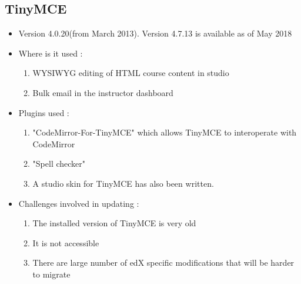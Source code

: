 \subsection{TinyMCE}
\begin{itemize}
	\item Version 4.0.20(from March 2013). Version 4.7.13 is available as of May 2018
	\item Where is it used :
		\begin{enumerate}
			\item WYSIWYG editing of HTML course content in studio
			\item Bulk email in the instructor dashboard
		\end{enumerate}
	\item Plugins used :
		\begin{enumerate}
			\item "CodeMirror-For-TinyMCE" which allows TinyMCE to interoperate with CodeMirror
			\item "Spell checker"
			\item A studio skin for TinyMCE has also been written.
		\end{enumerate}
	\item Challenges involved in updating :
		\begin{enumerate}
			\item The installed version of TinyMCE is very old
			\item It is not accessible
			\item There are large number of edX specific modifications that will be harder to migrate
		\end{enumerate}
\end{itemize}

